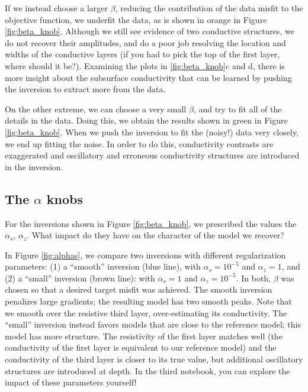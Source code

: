 \documentclass[11pt,oneside]{article}
\begin{document}
If we instead choose a larger $\beta$, reducing the contribution of the data misfit to the objective function, we underfit the data, as is shown in orange in Figure \ref{fig:beta_knob}. Although we still see evidence of two conductive structures, we do not recover their amplitudes, and do a poor job resolving the location and widths of the conductive layers (if you had to pick the top of the first layer, where should it be?). Examining the plots in \ref{fig:beta_knob}c and d, there is more insight about the subsurface conductivity that can be learned by pushing the inversion to extract more from the data.

On the other extreme, we can choose a very small $\beta$, and try to fit all of the details in the data. Doing this, we obtain the results shown in green in Figure \ref{fig:beta_knob}. When we push the inversion to fit the (noisy!) data very closely, we end up fitting the noise. In order to do this, conductivity contrasts are exaggerated and oscillatory and erroneous conductivity structures are introduced in the inversion.


\subsection{The $\alpha$ knobs}

For the inversions shown in Figure \ref{fig:beta_knob}, we prescribed the values the $\alpha_s$, $\alpha_z$. What impact do they have on the character of the model we recover?

In Figure \ref{fig:alphas}, we compare two inversions with different regularization parameters: (1) a ``smooth'' inversion (blue line), with $\alpha_s = 10^{-5}$ and $\alpha_z = 1$, and (2) a ``small'' inversion (brown line): with $\alpha_s = 1$ and $\alpha_z = 10^{-5}$. In both, $\beta$ was chosen so that a desired target misfit was achieved. The smooth inversion penalizes large gradients; the resulting model has two smooth peaks. Note that we smooth over the resistive third layer, over-estimating its conductivity. The ``small'' inversion instead favors models that are close to the reference model; this model has more structure. The resistivity of the first layer matches well (the conductivity of the first layer is equivalent to our reference model) and the conductivity of the third layer is closer to its true value, but additional oscillatory structures are introduced at depth. In the third notebook, you can explore the impact of these parameters yourself!
\end{document}
